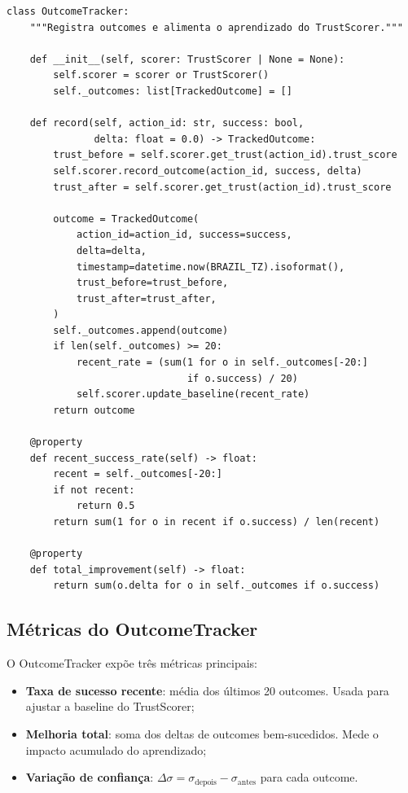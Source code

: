 \begin{lstlisting}[style=pythonstyle, caption={OutcomeTracker: registro e aprendizado (trust\_engine.py:402-453)}]
class OutcomeTracker:
    """Registra outcomes e alimenta o aprendizado do TrustScorer."""

    def __init__(self, scorer: TrustScorer | None = None):
        self.scorer = scorer or TrustScorer()
        self._outcomes: list[TrackedOutcome] = []

    def record(self, action_id: str, success: bool,
               delta: float = 0.0) -> TrackedOutcome:
        trust_before = self.scorer.get_trust(action_id).trust_score
        self.scorer.record_outcome(action_id, success, delta)
        trust_after = self.scorer.get_trust(action_id).trust_score

        outcome = TrackedOutcome(
            action_id=action_id, success=success,
            delta=delta,
            timestamp=datetime.now(BRAZIL_TZ).isoformat(),
            trust_before=trust_before,
            trust_after=trust_after,
        )
        self._outcomes.append(outcome)
        if len(self._outcomes) >= 20:
            recent_rate = (sum(1 for o in self._outcomes[-20:]
                               if o.success) / 20)
            self.scorer.update_baseline(recent_rate)
        return outcome

    @property
    def recent_success_rate(self) -> float:
        recent = self._outcomes[-20:]
        if not recent:
            return 0.5
        return sum(1 for o in recent if o.success) / len(recent)

    @property
    def total_improvement(self) -> float:
        return sum(o.delta for o in self._outcomes if o.success)
\end{lstlisting}

\subsection{Métricas do OutcomeTracker}

O OutcomeTracker expõe três métricas principais:

\begin{itemize}
\item \textbf{Taxa de sucesso recente}: média dos últimos 20 outcomes.
Usada para ajustar a baseline do TrustScorer;
\item \textbf{Melhoria total}: soma dos deltas de outcomes
bem-sucedidos. Mede o impacto acumulado do aprendizado;
\item \textbf{Variação de confiança}: $\Delta\sigma = \sigma_{\text{depois}}
- \sigma_{\text{antes}}$ para cada outcome.
\end{itemize}

